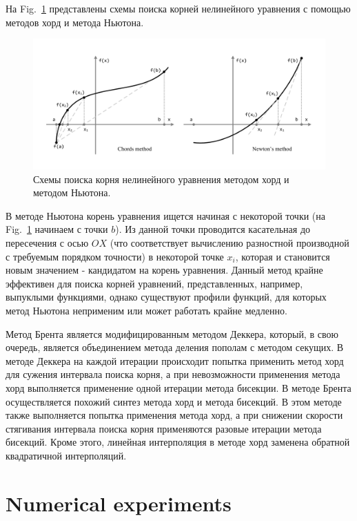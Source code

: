 \documentclass[
11pt,%
tightenlines,%
twoside,%
onecolumn,%
nofloats,%
nobibnotes,%
nofootinbib,%
superscriptaddress,%
noshowpacs,%
centertags]%
{revtex4}
\begin{document}
На Fig.~\ref{fig:chords-newton} представлены схемы поиска корней нелинейного уравнения с помощью методов хорд и метода Ньютона.

\begin{figure}[h]
\setcaptionmargin{5mm}
\onelinecaptionstrue
\includegraphics[width=1.0\textwidth]{pics/chords-newton.pdf}
\caption{Схемы поиска корня нелинейного уравнения методом хорд и методом Ньютона.}\label{fig:chords-newton}
\end{figure}

В методе Ньютона корень уравнения ищется начиная с некоторой точки (на Fig.~\ref{fig:chords-newton} начинаем с точки $b$).
Из данной точки проводится касательная до пересечения с осью $OX$ (что соответствует вычислению разностной производной с требуемым порядком точности) в некоторой точке $x_i$, которая и становится новым значением - кандидатом на корень уравнения.
Данный метод крайне эффективен для поиска корней уравнений, представленных, например, выпуклыми функциями, однако существуют профили функций, для которых метод Ньютона неприменим или может работать крайне медленно.

Метод Брента является модифицированным методом Деккера, который, в свою очередь, является объединением метода деления пополам с методом секущих.
В методе Деккера на каждой итерации происходит попытка применить метод хорд для сужения интервала поиска корня, а при невозможности применения метода хорд выполняется применение одной итерации метода бисекции.
В методе Брента осуществляется похожий синтез метода хорд и метода бисекций.
В этом методе также выполняется попытка применения метода хорд, а при снижении скорости стягивания интервала поиска корня применяются разовые итерации метода бисекций.
Кроме этого, линейная интерполяция в методе хорд заменена обратной квадратичной интерполяций.

\section{Numerical experiments}
\end{document}
